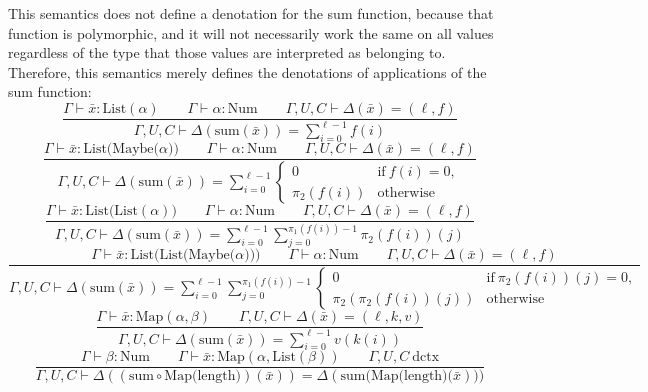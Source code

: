 \documentclass[11pt]{article}
\begin{document}
This semantics does not define a denotation for the sum function, because
that function is polymorphic, and it will not necessarily
work the same on all values regardless of the type that those values
are interpreted as belonging to. Therefore, this semantics merely defines the
denotations of applications of the sum function:
\begin{equation}
	\frac{
		\Gamma \vdash \bar{x} : \text{List}(\alpha)
		\qquad \Gamma \vdash \alpha : \text{Num}
		\qquad \Gamma,U,C \vdash \Delta(\bar{x}) = (\ell, f)
	}{
		\Gamma,U,C \vdash \Delta(\text{sum}(\bar{x}))
		= \sum_{i=0}^{\ell-1} f(i)
	}
\end{equation}
\begin{equation}
	\frac{
		\Gamma \vdash \bar{x} : \text{List(Maybe(}\alpha))
		\qquad \Gamma \vdash \alpha : \text{Num}
		\qquad \Gamma,U,C \vdash \Delta(\bar{x}) = (\ell,f)
	}{
		\Gamma,U,C \vdash \Delta(\text{sum}(\bar{x}))
		= \sum\limits_{i=0}^{\ell-1}
		\begin{cases}
			0 & \text{if}\ f(i) = 0, \\
			\pi_2(f(i)) & \text{otherwise}
		\end{cases}
	}
\end{equation}
\begin{equation}
	\frac{
		\Gamma \vdash \bar{x} : \text{List(List}(\alpha))
		\qquad \Gamma \vdash \alpha : \text{Num}
		\qquad \Gamma,U,C \vdash \Delta(\bar{x}) = (\ell, f)
	}{
		\Gamma,U,C \vdash \Delta(\text{sum}(\bar{x}))
		= \sum_{i=0}^{\ell-1} \sum_{j=0}^{\pi_1(f(i))-1} \pi_2(f(i))(j)
	}
\end{equation}
\begin{equation}
	\frac{
		\Gamma \vdash \bar{x} : \text{List(List(Maybe(}\alpha)))
		\qquad \Gamma \vdash \alpha : \text{Num}
		\qquad \Gamma,U,C \vdash \Delta(\bar{x}) = (\ell,f)
	}{
		\Gamma,U,C \vdash \Delta(\text{sum}(\bar{x}))
		= \sum\limits_{i=0}^{\ell-1} \sum\limits_{j=0}^{\pi_1(f(i))-1}
		\begin{cases}
			0 & \text{if}\ \pi_2(f(i))(j) = 0, \\
			\pi_2(\pi_2(f(i))(j)) & \text{otherwise}
		\end{cases}
	}
\end{equation}
\begin{equation}
	\frac{
		\Gamma \vdash \bar{x} : \text{Map}(\alpha, \beta)
		\qquad \Gamma,U,C \vdash \Delta(\bar{x}) = (\ell, k, v)
	}{
		\Gamma,U,C \vdash \Delta(\text{sum}(\bar{x}))
		= \sum_{i=0}^{\ell-1} v(k(i))
	}
\end{equation}
\begin{equation}
	\frac{
		\Gamma \vdash \beta : \text{Num}
		\qquad \Gamma \vdash \bar{x} : \text{Map}(\alpha, \text{List}(\beta))
		\qquad \Gamma,U,C\ \text{dctx}
	}{
		\Gamma,U,C \vdash \Delta((\text{sum} \circ \text{Map(length)})(\bar{x}))
		= \Delta(\text{sum(Map(length)(}\bar{x})))
	}
\end{equation}
\end{document}
